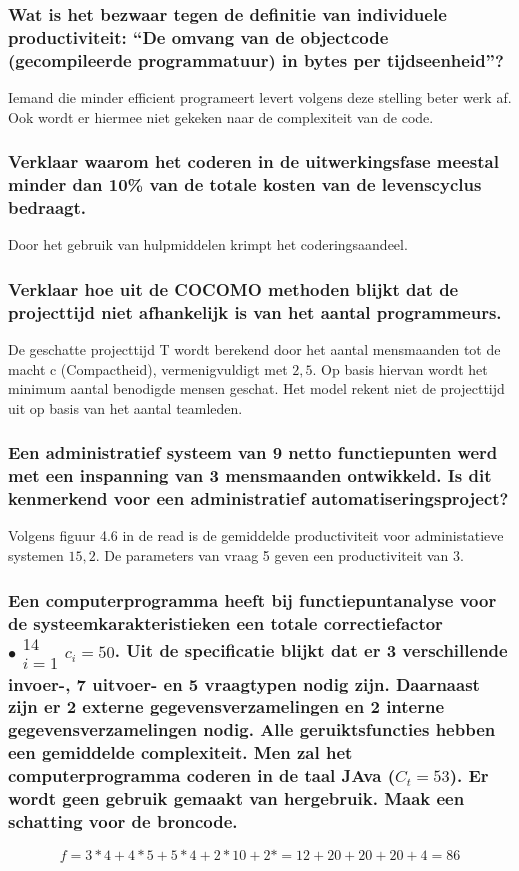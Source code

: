 \documentclass[a4paper,titlepage]{artikel1}
\begin{document}
   \subsubsection[Opdracht 2]{Wat is het bezwaar tegen de definitie van
   individuele productiviteit: ``De omvang van de objectcode
   (gecompileerde programmatuur) in bytes per tijdseenheid''?}
   Iemand die minder efficient programeert levert volgens deze stelling beter werk af. Ook wordt er hiermee niet gekeken naar de complexiteit van de code.
   
   \subsubsection[Opdracht 3]{Verklaar waarom het coderen in de
   uitwerkingsfase meestal minder dan 10\% van de totale kosten van de levenscyclus bedraagt.}
   Door het gebruik van hulpmiddelen krimpt het coderingsaandeel.
   
   \subsubsection[Opdracht 4]{Verklaar hoe uit de COCOMO methoden blijkt dat de projecttijd niet afhankelijk is van het aantal programmeurs.}
   De geschatte projecttijd T wordt berekend door het aantal mensmaanden tot de macht c (Compactheid), vermenigvuldigt met $2,5$. Op basis hiervan wordt het minimum aantal benodigde mensen geschat. Het model rekent niet de projecttijd uit op basis van het aantal teamleden.

   \subsubsection[Opdracht 5]{Een administratief systeem van 9 netto
   functiepunten werd met een inspanning van 3 mensmaanden
   ontwikkeld. Is dit kenmerkend voor een administratief
   automatiseringsproject?}
   Volgens figuur 4.6 in de read is de gemiddelde productiviteit voor administatieve systemen $15,2$. De parameters van vraag 5 geven een productiviteit van $3$.
   
   \subsubsection[Opdracht 6]{Een computerprogramma heeft bij functiepuntanalyse voor de systeemkarakteristieken een totale correctiefactor $\bullet \begin{array}{c}14\\i=1 \end{array} c_i=50$. Uit de specificatie blijkt dat er 3 verschillende invoer-, 7 uitvoer- en 5 vraagtypen nodig zijn. Daarnaast zijn er 2 externe gegevensverzamelingen en 2 interne gegevensverzamelingen nodig. Alle geruiktsfuncties hebben een gemiddelde complexiteit. Men zal het computerprogramma coderen in de taal JAva ($C_t=53$). Er wordt geen gebruik gemaakt van hergebruik. Maak een schatting voor de broncode.}
   \begin{displaymath}
    f=3*4+4*5+5*4+2*10+2*=12+20+20+20+4=86
   \end{displaymath}
   
\end{document}
